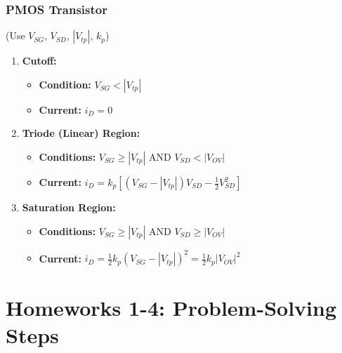 \documentclass[12pt, letterpaper]{article}
\begin{document}
\subsubsection*{PMOS Transistor} (Use $V_{SG}$, $V_{SD}$, $|V_{tp}|$, $k_p$)
\begin{enumerate}
    \item \textbf{Cutoff:}
    \begin{itemize}
        \item \textbf{Condition:} $V_{SG} < |V_{tp}|$
        \item \textbf{Current:} $i_D = 0$
    \end{itemize}
    
    \item \textbf{Triode (Linear) Region:}
    \begin{itemize}
        \item \textbf{Conditions:} $V_{SG} \ge |V_{tp}|$ AND $V_{SD} < |V_{OV}|$
        \item \textbf{Current:} $i_D = k_p \left[ (V_{SG} - |V_{tp}|)V_{SD} - \frac{1}{2}V_{SD}^2 \right]$
    \end{itemize}
    
    \item \textbf{Saturation Region:}
    \begin{itemize}
        \item \textbf{Conditions:} $V_{SG} \ge |V_{tp}|$ AND $V_{SD} \ge |V_{OV}|$
        \item \textbf{Current:} $i_D = \frac{1}{2} k_p (V_{SG} - |V_{tp}|)^2 = \frac{1}{2} k_p |V_{OV}|^2$
    \end{itemize}
\end{enumerate}

\hrulefill

\section*{Homeworks 1-4: Problem-Solving Steps}
\end{document}

